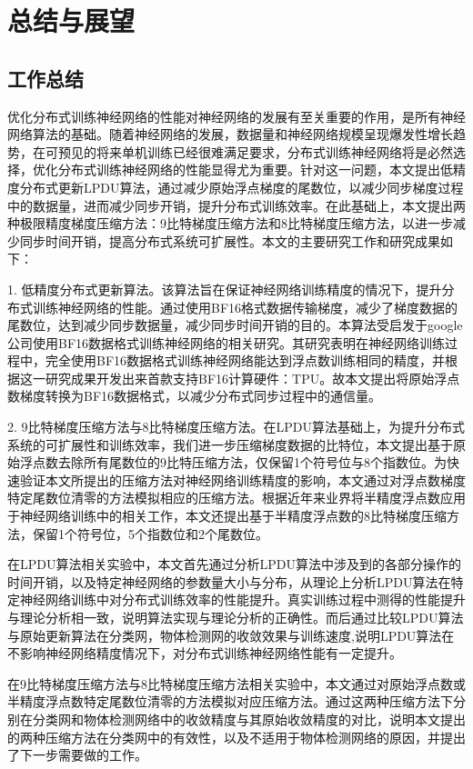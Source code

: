\chapter{总结与展望}
\section{工作总结}
优化分布式训练神经网络的性能对神经网络的发展有至关重要的作用，是所有神经网络算法的基础。随着神经网络的发展，数据量和神经网络规模呈现爆发性增长趋势，在可预见的将来单机训练已经很难满足要求，分布式训练神经网络将是必然选择，优化分布式训练神经网络的性能显得尤为重要。针对这一问题，本文提出低精度分布式更新LPDU算法，通过减少原始浮点梯度的尾数位，以减少同步梯度过程中的数据量，进而减少同步开销，提升分布式训练效率。在此基础上，本文提出两种极限精度梯度压缩方法：9比特梯度压缩方法和8比特梯度压缩方法，以进一步减少同步时间开销，提高分布式系统可扩展性。本文的主要研究工作和研究成果如下：

1. 低精度分布式更新算法。该算法旨在保证神经网络训练精度的情况下，提升分布式训练神经网络的性能。通过使用BF16格式数据传输梯度，减少了梯度数据的尾数位，达到减少同步数据量，减少同步时间开销的目的。本算法受启发于google公司使用BF16数据格式训练神经网络的相关研究。其研究表明在神经网络训练过程中，完全使用BF16数据格式训练神经网络能达到浮点数训练相同的精度，并根据这一研究成果开发出来首款支持BF16计算硬件：TPU。故本文提出将原始浮点数梯度转换为BF16数据格式，以减少分布式同步过程中的通信量。

2. 9比特梯度压缩方法与8比特梯度压缩方法。在LPDU算法基础上，为提升分布式系统的可扩展性和训练效率，我们进一步压缩梯度数据的比特位，本文提出基于原始浮点数去除所有尾数位的9比特压缩方法，仅保留1个符号位与8个指数位。为快速验证本文所提出的压缩方法对神经网络训练精度的影响，本文通过对浮点数梯度特定尾数位清零的方法模拟相应的压缩方法。根据近年来业界将半精度浮点数应用于神经网络训练中的相关工作，本文还提出基于半精度浮点数的8比特梯度压缩方法，保留1个符号位，5个指数位和2个尾数位。

在LPDU算法相关实验中，本文首先通过分析LPDU算法中涉及到的各部分操作的时间开销，以及特定神经网络的参数量大小与分布，从理论上分析LPDU算法在特定神经网络训练中对分布式训练效率的性能提升。真实训练过程中测得的性能提升与理论分析相一致，说明算法实现与理论分析的正确性。而后通过比较LPDU算法与原始更新算法在分类网，物体检测网的收敛效果与训练速度,说明LPDU算法在不影响神经网络精度情况下，对分布式训练神经网络性能有一定提升。

在9比特梯度压缩方法与8比特梯度压缩方法相关实验中，本文通过对原始浮点数或半精度浮点数特定尾数位清零的方法模拟对应压缩方法。通过这两种压缩方法下分别在分类网和物体检测网络中的收敛精度与其原始收敛精度的对比，说明本文提出的两种压缩方法在分类网中的有效性，以及不适用于物体检测网络的原因，并提出了下一步需要做的工作。

